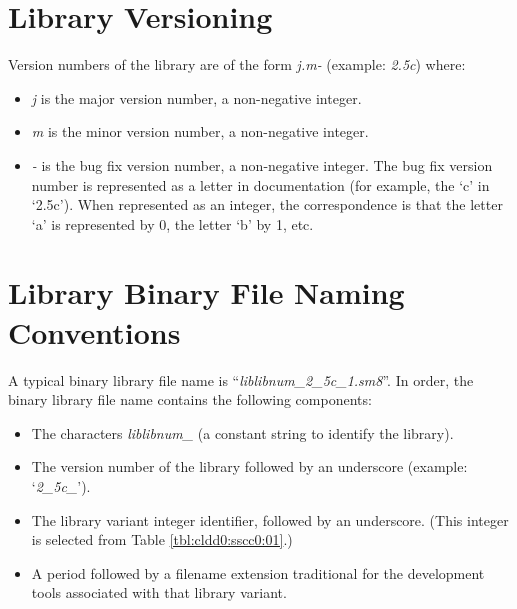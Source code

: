 \section{Library Versioning}
\label{cldd0:slvn0}

Version numbers of the library are of the
form \emph{j.m-} (example: \emph{2.5c}) where:

\begin{itemize}
\item \emph{j} is the major version number, a non-negative
      integer.
\item \emph{m} is the minor version number, a non-negative
      integer.
\item \emph{-} is the bug fix version number, a non-negative
      integer.  The bug fix version number
      is represented as a letter in documentation (for
      example, the `c' in `2.5c').
      When represented as an integer, the correspondence
      is that the letter `a' is represented by 0,
      the letter `b' by 1, etc.
\end{itemize}


\section{Library Binary File Naming Conventions}
\label{cldd0:slpn0}

%
A typical binary library file name is 
``\emph{liblibnum\_2\_5c\_1.sm8}''.
In order, the binary library file name contains the
following components:

\begin{itemize}
\item The characters \emph{liblibnum\_} (a constant string
      to identify the library).
\item The version number of the library followed by an
      underscore
      (example: `\emph{2\_5c\_}').
\item The library variant integer identifier, followed by
      an underscore.  (This integer
      is selected from Table \ref{tbl:cldd0:sscc0:01}.)
\item A period followed by a filename extension traditional
      for the
      development tools associated with that library
      variant.
\end{itemize}


